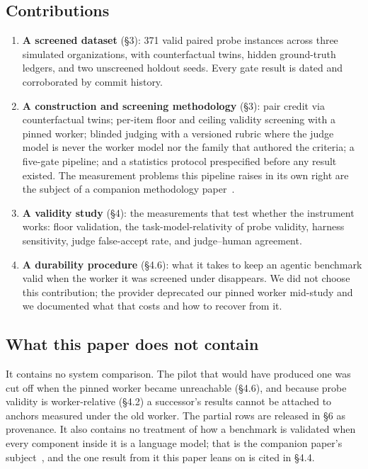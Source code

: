 \documentclass[11pt]{article}
\begin{document}
\subsection{Contributions}

\begin{enumerate}[leftmargin=*, itemsep=.25em]
\item \textbf{A screened dataset} (\S3): 371 valid paired probe instances across
three simulated organizations, with counterfactual twins, hidden ground-truth
ledgers, and two unscreened holdout seeds. Every gate result is dated and
corroborated by commit history.

\item \textbf{A construction and screening methodology} (\S3): pair credit via
counterfactual twins; per-item floor and ceiling validity screening with a pinned
worker; blinded judging with a versioned rubric where the judge model is never
the worker model nor the family that authored the criteria; a five-gate pipeline;
and a statistics protocol prespecified before any result existed. The measurement
problems this pipeline raises in its own right are the subject of a companion
methodology paper~\cite{pipeline}.

\item \textbf{A validity study} (\S4): the measurements that test whether the
instrument works: floor validation, the task-model-relativity of probe validity,
harness sensitivity, judge false-accept rate, and judge--human agreement.

\item \textbf{A durability procedure} (\S4.6): what it takes to keep an agentic
benchmark valid when the worker it was screened under disappears. We did not
choose this contribution; the provider deprecated our pinned worker mid-study and
we documented what that costs and how to recover from it.
\end{enumerate}

\subsection{What this paper does not contain}

It contains no system comparison. The pilot that would have produced one was cut
off when the pinned worker became unreachable (\S4.6), and because probe
validity is worker-relative (\S4.2) a successor's results cannot be attached to
anchors measured under the old worker. The partial rows are released in \S6 as
provenance. It also contains no treatment of how a benchmark
is validated when every component inside it is a language model; that is the
companion paper's subject~\cite{pipeline}, and the one result from it this paper
leans on is cited in \S4.4.
\end{document}
